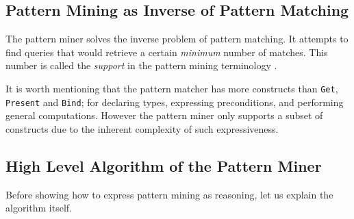 \documentclass[runningheads]{llncs}
\begin{document}
\subsection{Pattern Mining as Inverse of Pattern Matching}

The pattern miner solves the inverse problem of pattern matching. It
attempts to find queries that would retrieve a certain \emph{minimum}
number of matches. This number is called the \emph{support} in the
pattern mining terminology \cite{Chi2005Freq,
  Agrawal1994fastalgorithms}.

It is worth mentioning that the pattern matcher has more constructs
than \texttt{Get}, \texttt{Present} and \texttt{Bind}; for declaring
types, expressing preconditions, and performing general
computations. However the pattern miner only supports a subset of
constructs due to the inherent complexity of such expressiveness.

\subsection{High Level Algorithm of the Pattern Miner}

Before showing how to express pattern mining as reasoning, let us
explain the algorithm itself.
\end{document}
